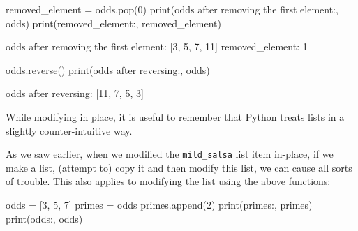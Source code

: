 \documentclass[
  letterpaper,
  DIV=11,
  numbers=noendperiod]{scrartcl}
\newenvironment{Shaded}{\begin{snugshade}}{\end{snugshade}}
\newcommand{\BuiltInTok}[1]{\textcolor[rgb]{0.00,0.23,0.31}{#1}}
\newcommand{\DecValTok}[1]{\textcolor[rgb]{0.68,0.00,0.00}{#1}}
\newcommand{\NormalTok}[1]{\textcolor[rgb]{0.00,0.23,0.31}{#1}}
\newcommand{\OperatorTok}[1]{\textcolor[rgb]{0.37,0.37,0.37}{#1}}
\newcommand{\StringTok}[1]{\textcolor[rgb]{0.13,0.47,0.30}{#1}}
\theoremstyle{remark}
\begin{document}
\begin{Shaded}
\begin{Highlighting}[]
\NormalTok{removed\_element }\OperatorTok{=}\NormalTok{ odds.pop(}\DecValTok{0}\NormalTok{)}
\BuiltInTok{print}\NormalTok{(}\StringTok{\textquotesingle{}odds after removing the first element:\textquotesingle{}}\NormalTok{, odds)}
\BuiltInTok{print}\NormalTok{(}\StringTok{\textquotesingle{}removed\_element:\textquotesingle{}}\NormalTok{, removed\_element)}
\end{Highlighting}
\end{Shaded}

\begin{Shaded}
\begin{Highlighting}[]
\NormalTok{odds after removing the first element: [3, 5, 7, 11]}
\NormalTok{removed\_element: 1}
\end{Highlighting}
\end{Shaded}

\begin{Shaded}
\begin{Highlighting}[]
\NormalTok{odds.reverse()}
\BuiltInTok{print}\NormalTok{(}\StringTok{\textquotesingle{}odds after reversing:\textquotesingle{}}\NormalTok{, odds)}
\end{Highlighting}
\end{Shaded}

\begin{Shaded}
\begin{Highlighting}[]
\NormalTok{odds after reversing: [11, 7, 5, 3]}
\end{Highlighting}
\end{Shaded}

While modifying in place, it is useful to remember that Python treats
lists in a slightly counter-intuitive way.

As we saw earlier, when we modified the \texttt{mild\_salsa} list item
in-place, if we make a list, (attempt to) copy it and then modify this
list, we can cause all sorts of trouble. This also applies to modifying
the list using the above functions:

\begin{Shaded}
\begin{Highlighting}[]
\NormalTok{odds }\OperatorTok{=}\NormalTok{ [}\DecValTok{3}\NormalTok{, }\DecValTok{5}\NormalTok{, }\DecValTok{7}\NormalTok{]}
\NormalTok{primes }\OperatorTok{=}\NormalTok{ odds}
\NormalTok{primes.append(}\DecValTok{2}\NormalTok{)}
\BuiltInTok{print}\NormalTok{(}\StringTok{\textquotesingle{}primes:\textquotesingle{}}\NormalTok{, primes)}
\BuiltInTok{print}\NormalTok{(}\StringTok{\textquotesingle{}odds:\textquotesingle{}}\NormalTok{, odds)}
\end{Highlighting}
\end{Shaded}
\end{document}
